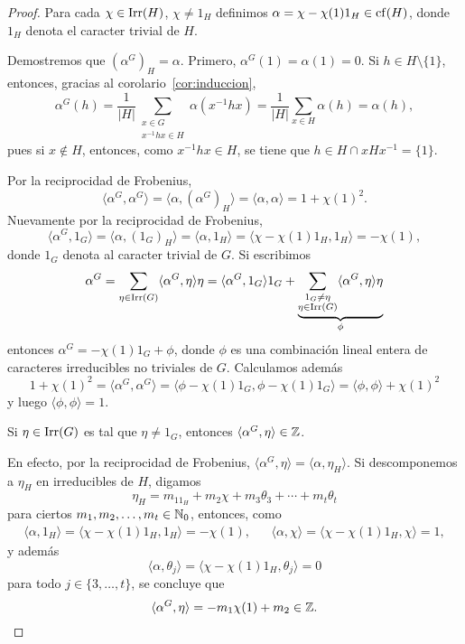 \begin{proof}
  Para cada $\chi\in\operatorname{Irr}(H)$, $\chi\ne1_H$ definimos
  $\alpha=\chi-\chi(1)1_H\in\operatorname{cf}(H)$, donde $1_H$ denota el caracter trivial de $H$. 

  Demostremos que $(\alpha^G)_H=\alpha$.
  Primero, $\alpha^G(1)=\alpha(1)=0$. Si $h\in H\setminus\{1\}$, entonces, gracias al corolario~\ref{cor:induccion}, 
  \[
    \alpha^G(h)=\frac{1}{|H|}\sum_{\substack{x\in G\\x^{-1}hx\in H}}\alpha(x^{-1}hx)
    =\frac{1}{|H|}\sum_{x\in H}\alpha(h)=\alpha(h),
  \]
  pues si $x\not\in H$, entonces, como $x^{-1}hx\in H$, se tiene que $h\in H\cap xHx^{-1}=\{1\}$.

  Por la reciprocidad de Frobenius, 
  \begin{equation}
    \label{eq:<a,a>=1+chi2}
    \langle\alpha^G,\alpha^G\rangle
    =\langle\alpha,(\alpha^G)_H\rangle=\langle\alpha,\alpha\rangle
    =1+\chi(1)^2.
  \end{equation}
  Nuevamente por la reciprocidad de Frobenius, 
  \[
  \langle\alpha^G,1_G\rangle
  =\langle\alpha,(1_G)_H\rangle
  =\langle\alpha,1_H\rangle
  =\langle\chi-\chi(1)1_H,1_H\rangle
  =-\chi(1),
  \]
  donde $1_G$ denota al caracter trivial de $G$. Si escribimos
  \[
  \alpha^G=\sum_{\eta\in\operatorname{Irr}(G)}\langle\alpha^G,\eta\rangle\eta
  =\langle\alpha^G,1_G\rangle1_G+\underbrace{\sum_{\substack{1_G\ne\eta\\\eta\in\operatorname{Irr}(G)}}\langle\alpha^G,\eta\rangle\eta}_{\phi}
  \]
  entonces $\alpha^G=-\chi(1)1_G+\phi$, donde $\phi$ es una 
  combinación lineal entera de caracteres irreducibles no triviales de $G$. 
  Calculamos además
  \[
  1+\chi(1)^2=\langle\alpha^G,\alpha^G\rangle
  =\langle\phi-\chi(1)1_G,\phi-\chi(1)1_G\rangle
  =\langle\phi,\phi\rangle+\chi(1)^2
  \]
  y luego $\langle\phi,\phi\rangle=1$. 
  
  \begin{claim}
  Si $\eta\in\operatorname{Irr}(G)$ es tal que $\eta\ne 1_G$, entonces $\langle\alpha^G,\eta\rangle\in\mathbb{Z}$. 
  \end{claim}
  
  En efecto, por la reciprocidad de Frobenius, $\langle\alpha^G,\eta\rangle=\langle\alpha,\eta_H\rangle$. 
  Si descomponemos a $\eta_H$ en irreducibles de $H$, digamos
  \[
  \eta_H=m_11_H+m_2\chi+m_3\theta_3+\cdots+m_t\theta_t
  \]
  para ciertos $m_1,m_2,\dots,m_t\in\mathbb{N}_{0}$, 
  entonces, como
  \begin{align*}
  \langle\alpha,1_H\rangle=\langle\chi-\chi(1)1_H,1_H\rangle=-\chi(1),
  &&\langle\alpha,\chi\rangle=\langle\chi-\chi(1)1_H,\chi\rangle=1,
  \end{align*}
  y además 
  \[
  \langle\alpha,\theta_j\rangle=\langle\chi-\chi(1)1_H,\theta_j\rangle=0
  \]
  para todo $j\in\{3,\dots,t\}$, se concluye que
  \[
  \langle\alpha^G,\eta\rangle=-m_1\chi(1)+m_2\in\mathbb{Z}.
  \]
  

\end{proof}
